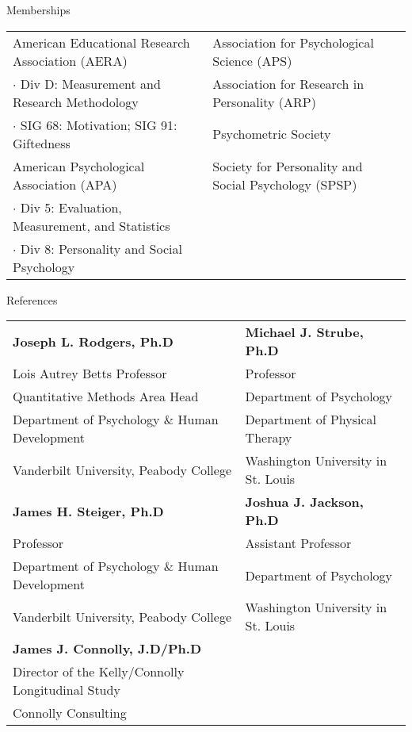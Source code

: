 \documentclass {resume}
\begin{document}
\begin{samepage}\begin{rSection}{\textrm{Memberships}}
\begin{tabular}{ l l }
American Educational Research Association (AERA)& Association for Psychological Science (APS) \\
$\cdot$ {\small Div D: Measurement and Research Methodology} &  Association for Research in Personality (ARP)\\
$\cdot$ {\small SIG 68: Motivation; SIG 91: Giftedness}& Psychometric Society\\
American Psychological Association (APA) & Society for Personality and Social Psychology (SPSP)\\
$\cdot$ {\small Div 5: Evaluation, Measurement, and Statistics} &  %
\\
$\cdot$ {\small Div 8: Personality and Social Psychology} \\
\end{tabular}
\end{rSection}\end{samepage}

\pagebreak
\begin{samepage}\begin{rSection}{\textrm{References}}
\begin{tabular}{ l l }
\textbf{Joseph L. Rodgers, Ph.D} & \textbf{Michael J. Strube, Ph.D}\\
Lois Autrey Betts Professor & Professor\\
Quantitative Methods Area Head & Department of Psychology\\
Department of Psychology $\&$ Human Development & Department of Physical Therapy\\
Vanderbilt University, Peabody College & Washington University in St. Louis\bigskip\\

\textbf{James H. Steiger, Ph.D} & \textbf{Joshua J. Jackson, Ph.D}\\
Professor & Assistant Professor\\
Department of Psychology $\&$ Human Development & Department of Psychology\\
Vanderbilt University, Peabody College & Washington University in St. Louis\bigskip\\
\textbf{James J. Connolly, J.D/Ph.D} 
\\
Director of the Kelly/Connolly Longitudinal Study\\ 
Connolly Consulting\\
%
\end{tabular}\end{rSection}\end{samepage}
\end{document}
